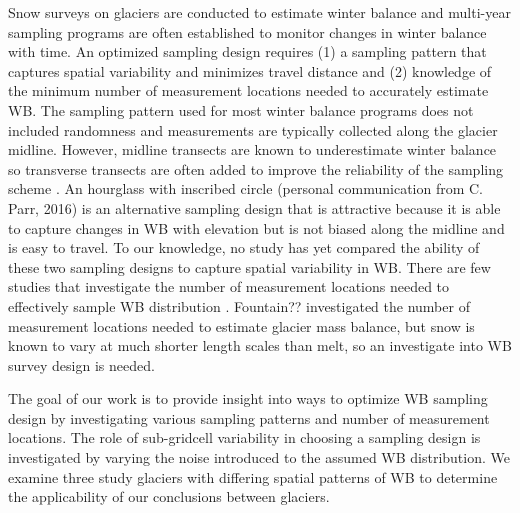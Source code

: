\documentclass[twocolumn,letterpaper]{igs}
\begin{document}
Snow surveys on glaciers are conducted to estimate winter balance and multi-year sampling programs are often established to monitor changes in winter balance with time. An optimized sampling design requires (1) a sampling pattern that captures spatial variability and minimizes travel distance and (2) knowledge of the minimum number of measurement locations needed to accurately estimate WB. The sampling pattern used for most winter balance programs does not included randomness and measurements are typically collected along the glacier midline. However, midline transects are known to underestimate winter balance so transverse transects are often added to improve the reliability of the sampling scheme \citep[e.g.][]{Walmsley2015}. An hourglass with inscribed circle (personal communication from C. Parr, 2016) is an alternative sampling design that is attractive because it is able to capture changes in WB with elevation but is not biased along the midline and is easy to travel. To our knowledge, no study has yet compared the ability of these two sampling designs to capture spatial variability in WB. There are few studies that investigate the number of measurement locations needed to effectively sample WB distribution \citep[c.f.][]{Walmsley2015}. Fountain?? investigated the number of measurement locations needed to estimate glacier mass balance, but snow is known to vary at much shorter length scales than melt, so an investigate into WB survey design is needed. 

The goal of our work is to provide insight into ways to optimize WB sampling design by investigating various sampling patterns and number of measurement locations. The role of sub-gridcell variability in choosing a sampling design is investigated by varying the noise introduced to the assumed WB distribution. We examine three study glaciers with differing spatial patterns of WB to determine the applicability of our conclusions between glaciers. 
\end{document}
